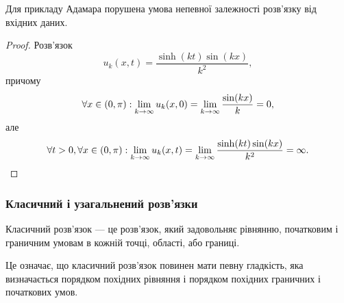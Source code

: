 \begin{proposition}
    Для прикладу Адамара порушена умова непевної залежності розв'язку від вхідних даних.
\end{proposition}

\begin{proof}
    Розв'язок
    \begin{equation}
        u_k(x, t) = \frac{\sinh(k t) \sin (k x)}{k^2},
    \end{equation}
    причому
    \begin{equation}
        \forall x \in (0, \pi): \displaystyle\lim\limits_{k \to \infty} u_k(x, 0) =  \displaystyle\lim\limits_{k \to \infty} \frac{\sin (k x)}{k} = 0,
    \end{equation}
    але
    \begin{equation}
        \forall t > 0, \forall x \in (0, \pi): \displaystyle\lim\limits_{k \to \infty} u_k(x, t) =  \displaystyle\lim\limits_{k \to \infty} \frac{\sinh(k t) \sin (k x)}{k^2} = \infty.
    \end{equation}
\end{proof}

\subsubsection{Класичний і узагальнений розв'язки}

\begin{definition}
    Класичний розв'язок --- це розв'язок, який задовольняє рівнянню, початковим і граничним умовам в кожній точці, області, або границі.    
\end{definition}

Це означає, що класичний розв'язок повинен мати певну гладкість, яка визначається порядком похідних рівняння і порядком похідних граничних і початкових умов.

\newpage 

